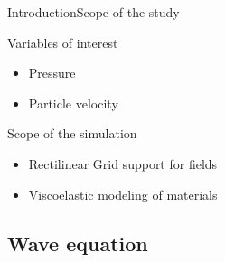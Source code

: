 \documentclass[9pt, xcolor={usenames, dvipsnames}]{beamer}
\begin{document}
				\begin{frame}{Introduction}{Scope of the study}
					\centering
					\begin{minipage}{0.6\textwidth}
						\begin{block}{Variables of interest}
							\begin{itemize}
								\item Pressure
								\item Particle velocity
							\end{itemize}
						\end{block}
						\begin{block}{Scope of the simulation}
							\begin{itemize}
								\item Rectilinear Grid support for fields
								\item Viscoelastic modeling of materials
							\end{itemize}
						\end{block}
					\end{minipage}
				\end{frame}

			\subsection{Wave equation}
\end{document}
